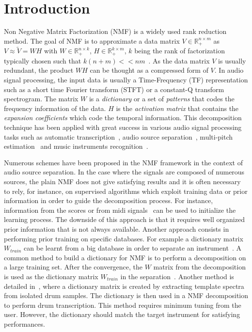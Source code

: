 \section{Introduction}
\label{sec:intro}

Non Negative Matrix Factorization (NMF) is a widely used rank reduction method. The goal of NMF is to approximate a data matrix $V \in \mathbb{R}_{+}^{n \times m} $ as $V \approx \tilde{V} = WH$ with $W \in \mathbb{R}_{+}^{n \times k}$, $H \in \mathbb{R}_{+}^{k \times m}$, $k$ being the rank of factorization typically chosen such that \mbox{$k(n+m) << nm  $}~\cite{lee99}. As the data matrix $V$ is usually redundant, the product $WH$ can be thought as a compressed form of $V$. In audio signal processing, the input data is usually a Time-Frequency (TF) representation such as a short time Fourier transform (STFT) or a constant-Q transform spectrogram. The matrix $W$ is a {\em dictionary} or a set of {\em patterns} that codes the frequency information of the data. $H$ is the {\em activation matrix} that contains the {\em expansion coefficients} which code the temporal information.
This decomposition technique has been applied with great success in various audio signal processing tasks such as automatic transcription~\cite{EwertM12,NB:ICASSP-07}, audio source separation~\cite{HennequinDAFx2010,JLD:TASLP10}, multi-pitch estimation~\cite{raczynski2007multipitch} and music instruments recognition~\cite{cichocki2009nonnegative}.

Numerous schemes have been proposed in the NMF framework in the context of audio source separation. In the case where the signals are composed of numerous sources, the plain NMF does not give satisfying results and it is often necessary to rely, for instance, on supervised algorithms which exploit training data or prior information in order to guide the decomposition process. For instance, information from the scores or from midi signals~\cite{EwertM12} can be used to initialize the learning process. The downside of this approach is that it requires well organized prior information that is not always available. Another approach consists in performing prior training on specific databases. For example a dictionary matrix $W_{train}$ can be learnt from a big database in order to separate an instrument~\cite{jaureguiberry2011adaptation,wudrum}. A common method to build a dictionary for NMF is to perform a decomposition on a large training set. After the convergence, the $W$ matrix from the decomposition is used as the dictionary matrix $W_{train}$ in the separation~\cite{jaureguiberry2011adaptation}. Another method is detailed in~\cite{wudrum}, where a dictionary matrix is created by extracting template spectra from isolated drum samples. The dictionary is then used in a NMF decomposition to perform drum transcription. This method requires minimum tuning from the user. However, the dictionary should match the target instrument for satisfying performances. 

